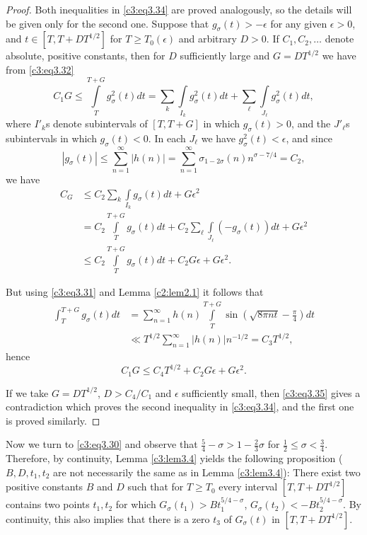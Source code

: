 \begin{proof}
  Both inequalities in  \eqref{c3:eq3.34} are proved analogously, so
  the details will be given only for the second one. Suppose that
  $g_\sigma(t) > - \epsilon$ for any given $\epsilon > 0$, and $t \in
  [T, T+ DT^{1/2}]$ for $T \geq  T_0 (\epsilon)$ and arbitrary $D> 0$. If
  $C_1, C_2, \ldots$ denote absolute, positive constants, then for
  $D$ sufficiently large and $G= DT^{1/2}$ we have from
  \eqref{c3:eq3.32}
  $$
  C_1 G \leq \int\limits_T^{T+G} g_\sigma^2 (t) dt = \sum_{k}
  \int\limits_{I_k} g_\sigma^2 (t) dt + \sum_{\ell}
  \int\limits_{J_\ell} g_\sigma^2 (t) dt,
  $$
  where $I'_k$s denote subintervals of $[T, T+ G]$ in which
  $g_\sigma(t) >0$, and the $J'_{\ell}$s subintervals in which
  $g_\sigma(t)< 0$. In each $J_\ell$ we have $g_\sigma^2 (t) <
  \epsilon$, and since
  $$
  |g_\sigma (t)| \leq \sum_{n=1}^\infty |h(n)|= \sum_{n=1}^\infty
  \sigma_{1- 2\sigma}(n) n^{\sigma - 7/4}= C_2,
  $$
  we have
  \begin{align*}
    C_G & \leq C_2 \sum_{k}\int\limits_{I_k} g_\sigma (t) dt + G
    \epsilon^2\\
    & = C_2 \int\limits_T^{T+G} g_\sigma (t) dt + C_2 \sum_{\ell}
    \int\limits_{J_\ell} (- g_\sigma (t)) dt + G \epsilon^2\\
    & \leq C_2 \int\limits_T^{T+G} g_\sigma (t) dt + C_2 G \epsilon +
    G \epsilon^2.
  \end{align*}

But using \eqref{c3:eq3.31} and Lemma \ref{c2:lem2.1} it follows that
\begin{align*}
  \int_{T}^{T+G} g_\sigma (t) dt & = \sum_{n=1}^\infty h(n)
  \int\limits_T^{T+G} \sin \left(\sqrt{8 \pi n t}-
  \frac{\pi}{4}\right) dt\\
  & \ll T^{1/2} \sum_{n=1}^\infty |h(n)|n^{-1/2} = C_3 T^{1/2},
\end{align*}
hence\pageoriginale 
\begin{equation}
  C_1 G \leq C_4 T^{1/2} + C_2 G \epsilon + G\epsilon^2.\label{c3:eq3.35}
\end{equation}

If we take $G= DT^{1/2}$, $D> C_4/C_1$ and $\epsilon$ sufficiently
small, then \eqref{c3:eq3.35} gives a contradiction which proves the
second inequality in \eqref{c3:eq3.34}, and the first one is proved
similarly. 
\end{proof}

Now we turn to \eqref{c3:eq3.30} and observe that $\frac{5}{4} - \sigma
> 1 - \frac{2}{3}\sigma$ for $\frac{1}{2} \leq \sigma <
\frac{3}{4}$. Therefore, by continuity, Lemma \ref{c3:lem3.4} yields
the following proposition ($B, D, t_1, t_2$ are not necessarily the
same as in Lemma \ref{c3:lem3.4}): There exist two positive constants
$B$ and $D$ such that for $T \geq T_0$ every interval $[T, T+
  DT^{1/2}]$ contains two points $t_1, t_2$ for which $G_\sigma (t_1)
> B t_1^{5/4-\sigma}$, $G_\sigma (t_2) 
< - B t_2^{5/4-\sigma}$. By continuity, this also implies that there
is a zero $t_3$ of $G_\sigma(t)$ in $[T, T+ DT^{1/2}]$.

